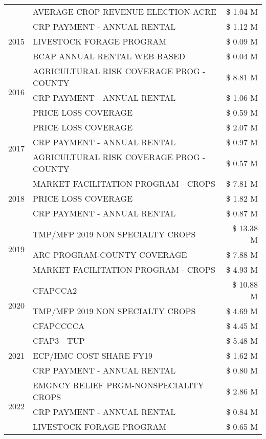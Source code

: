 \begin{tabular}{llr}
 & AVERAGE CROP REVENUE ELECTION-ACRE & \$ 1.04 M \\
\cline{1-3}
\multirow[t]{3}{*}{2015} & CRP PAYMENT - ANNUAL RENTAL & \$ 1.12 M \\
 & LIVESTOCK FORAGE PROGRAM & \$ 0.09 M \\
 & BCAP ANNUAL RENTAL WEB BASED & \$ 0.04 M \\
\cline{1-3}
\multirow[t]{3}{*}{2016} & AGRICULTURAL RISK COVERAGE PROG - COUNTY & \$ 8.81 M \\
 & CRP PAYMENT - ANNUAL RENTAL & \$ 1.06 M \\
 & PRICE LOSS COVERAGE & \$ 0.59 M \\
\cline{1-3}
\multirow[t]{3}{*}{2017} & PRICE LOSS COVERAGE & \$ 2.07 M \\
 & CRP PAYMENT - ANNUAL RENTAL & \$ 0.97 M \\
 & AGRICULTURAL RISK COVERAGE PROG - COUNTY & \$ 0.57 M \\
\cline{1-3}
\multirow[t]{3}{*}{2018} & MARKET FACILITATION PROGRAM - CROPS & \$ 7.81 M \\
 & PRICE LOSS COVERAGE & \$ 1.82 M \\
 & CRP PAYMENT - ANNUAL RENTAL & \$ 0.87 M \\
\cline{1-3}
\multirow[t]{3}{*}{2019} & TMP/MFP 2019 NON SPECIALTY CROPS & \$ 13.38 M \\
 & ARC PROGRAM-COUNTY COVERAGE & \$ 7.88 M \\
 & MARKET FACILITATION PROGRAM - CROPS & \$ 4.93 M \\
\cline{1-3}
\multirow[t]{3}{*}{2020} & CFAPCCA2 & \$ 10.88 M \\
 & TMP/MFP 2019 NON SPECIALTY CROPS & \$ 4.69 M \\
 & CFAPCCCCA & \$ 4.45 M \\
\cline{1-3}
\multirow[t]{3}{*}{2021} & CFAP3 - TUP & \$ 5.48 M \\
 & ECP/HMC COST SHARE FY19 & \$ 1.62 M \\
 & CRP PAYMENT - ANNUAL RENTAL & \$ 0.80 M \\
\cline{1-3}
\multirow[t]{3}{*}{2022} & EMGNCY RELIEF PRGM-NONSPECIALITY CROPS & \$ 2.86 M \\
 & CRP PAYMENT - ANNUAL RENTAL & \$ 0.84 M \\
 & LIVESTOCK FORAGE PROGRAM & \$ 0.65 M \\
\cline{1-3}
\bottomrule
\end{tabular}
